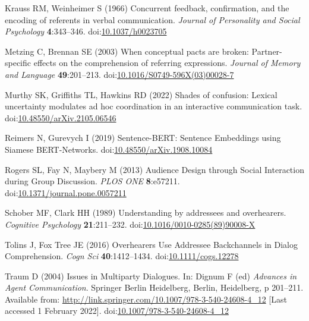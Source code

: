 \documentclass[
  english,
  a4paper,
]{article}
\newlength{\cslhangindent}
\newlength{\cslentryspacingunit} %
\newenvironment{CSLReferences}[2] %
 {%
  \setlength{\parindent}{0pt}
  \ifodd #1
  \let\oldpar\par
  \def\par{\hangindent=\cslhangindent\oldpar}
  \fi
  \setlength{\parskip}{#2\cslentryspacingunit}
 }%
 {}
\begin{document}
\begin{CSLReferences}{1}{0}
\leavevmode{}%
Krauss RM, Weinheimer S (1966) Concurrent feedback, confirmation, and the encoding of referents in verbal communication. \emph{Journal of Personality and Social Psychology} \textbf{4}:343--346. doi:\href{https://doi.org/10.1037/h0023705}{10.1037/h0023705}

\leavevmode{}%
Metzing C, Brennan SE (2003) When conceptual pacts are broken: {Partner-specific} effects on the comprehension of referring expressions. \emph{Journal of Memory and Language} \textbf{49}:201--213. doi:\href{https://doi.org/10.1016/S0749-596X(03)00028-7}{10.1016/S0749-596X(03)00028-7}

\leavevmode{}%
Murthy SK, Griffiths TL, Hawkins RD (2022) Shades of confusion: {Lexical} uncertainty modulates ad hoc coordination in an interactive communication task. doi:\href{https://doi.org/10.48550/arXiv.2105.06546}{10.48550/arXiv.2105.06546}

\leavevmode{}%
Reimers N, Gurevych I (2019) Sentence-{BERT}: {Sentence Embeddings} using {Siamese BERT-Networks}. doi:\href{https://doi.org/10.48550/arXiv.1908.10084}{10.48550/arXiv.1908.10084}

\leavevmode{}%
Rogers SL, Fay N, Maybery M (2013) Audience {Design} through {Social Interaction} during {Group Discussion}. \emph{PLOS ONE} \textbf{8}:e57211. doi:\href{https://doi.org/10.1371/journal.pone.0057211}{10.1371/journal.pone.0057211}

\leavevmode{}%
Schober MF, Clark HH (1989) Understanding by addressees and overhearers. \emph{Cognitive Psychology} \textbf{21}:211--232. doi:\href{https://doi.org/10.1016/0010-0285(89)90008-X}{10.1016/0010-0285(89)90008-X}

\leavevmode{}%
Tolins J, Fox Tree JE (2016) Overhearers {Use Addressee Backchannels} in {Dialog Comprehension}. \emph{Cogn Sci} \textbf{40}:1412--1434. doi:\href{https://doi.org/10.1111/cogs.12278}{10.1111/cogs.12278}

\leavevmode{}%
Traum D (2004) Issues in {Multiparty Dialogues}. In: Dignum F (ed) \emph{Advances in {Agent Communication}}. {Springer Berlin Heidelberg}, {Berlin, Heidelberg}, p 201--211. Available from: \url{http://link.springer.com/10.1007/978-3-540-24608-4_12} {[}Last accessed 1 February 2022{]}. doi:\href{https://doi.org/10.1007/978-3-540-24608-4_12}{10.1007/978-3-540-24608-4\_12}


\end{CSLReferences}
\end{document}
